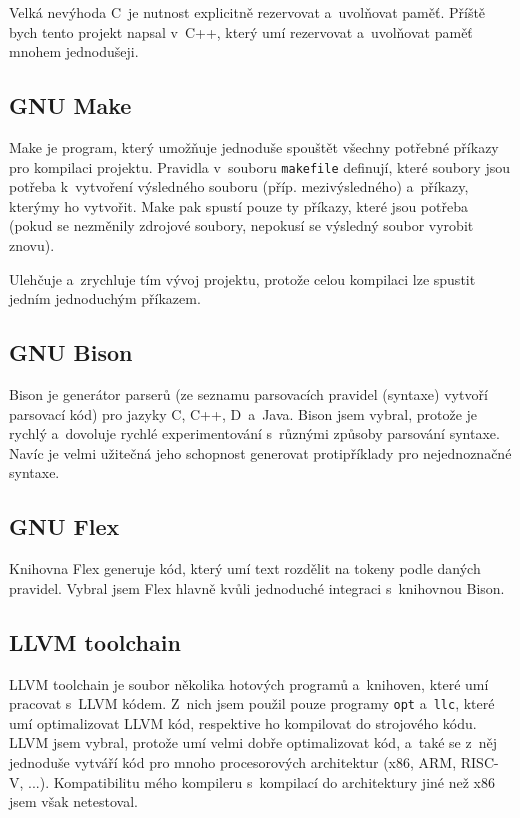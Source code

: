 \documentclass[12pt]{article}
\def\file#1{\texttt{#1}}
\begin{document}
Velká nevýhoda C~je nutnost explicitně rezervovat a~uvolňovat paměť. Příště bych tento projekt napsal v~C++, který umí rezervovat a~uvolňovat paměť mnohem jednodušeji.

\subsection{GNU Make}
Make je program, který umožňuje jednoduše spouštět všechny potřebné příkazy pro kompilaci projektu.
Pravidla v~souboru \file{makefile} definují, které soubory jsou potřeba k~vytvoření výsledného souboru (příp. mezivýsledného) a~příkazy, kterýmy ho vytvořit.
Make pak spustí pouze ty příkazy, které jsou potřeba (pokud se nezměnily zdrojové soubory, nepokusí se výsledný soubor vyrobit znovu).

Ulehčuje a~zrychluje tím vývoj projektu, protože celou kompilaci lze spustit jedním jednoduchým příkazem.

\subsection{GNU Bison}
Bison je generátor parserů (ze seznamu parsovacích pravidel (syntaxe) vytvoří parsovací kód) pro jazyky C, C++, D~a~Java. \cite{bison:docs}
Bison jsem vybral, protože je rychlý a~dovoluje rychlé experimentování s~různými způsoby parsování syntaxe.
Navíc je velmi užitečná jeho schopnost generovat protipříklady pro nejednoznačné syntaxe.

\subsection{GNU Flex}
Knihovna Flex generuje kód, který umí text rozdělit na tokeny podle daných pravidel.
Vybral jsem Flex hlavně kvůli jednoduché integraci s~knihovnou Bison.

\subsection{LLVM toolchain}
LLVM toolchain je soubor několika hotových programů a~knihoven, které umí pracovat s~LLVM kódem.
Z~nich jsem použil pouze programy \texttt{opt} a~\texttt{llc}, které umí optimalizovat LLVM kód, respektive ho kompilovat do strojového kódu.
LLVM jsem vybral, protože umí velmi dobře optimalizovat kód, a~také se z~něj jednoduše vytváří kód pro mnoho procesorových architektur (x86, ARM, RISC-V, ...).
Kompatibilitu mého kompileru s~kompilací do architektury jiné než x86 jsem však netestoval.
\end{document}
